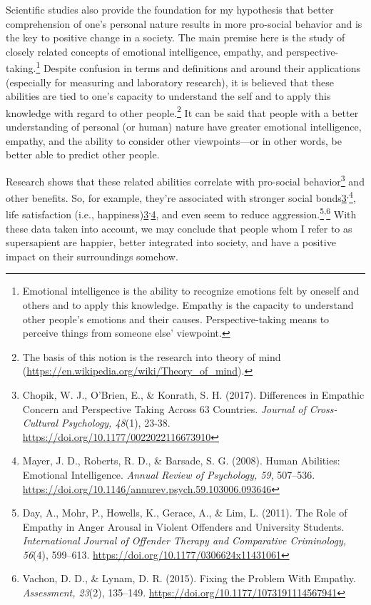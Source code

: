 \documentclass[12pt]{report}
\begin{document}
Scientific studies also provide the foundation for my hypothesis that better comprehension of one’s personal nature results in more pro-social behavior and is the key to positive change in a society. The main premise here is the study of closely related concepts of emotional intelligence, empathy, and perspective-taking.\footnote{Emotional intelligence is the ability to recognize emotions felt by oneself and others and to apply this knowledge. Empathy is the capacity to understand other people’s emotions and their causes. Perspective-taking means to perceive things from someone else’ viewpoint.} Despite confusion in terms and definitions and around their applications (especially for measuring and laboratory research), it is believed that these abilities are tied to one’s capacity to understand the self and to apply this knowledge with regard to other people.\footnote{The basis of this notion is the research into theory of mind (\url{https://en.wikipedia.org/wiki/Theory_of_mind}).} It can be said that people with a better understanding of personal (or human) nature have greater emotional intelligence, empathy, and the ability to consider other viewpoints\thinspace---\thinspace or in other words, be better able to predict other people.

\noindent Research shows that these related abilities correlate with pro-social behavior\footnote{\label{one}Chopik, W. J., O’Brien, E., \& Konrath, S. H. (2017). Differences in Empathic Concern and Perspective Taking Across 63 Countries. \emph{Journal of Cross-Cultural Psychology, 48}(1), 23-38. \url{https://doi.org/10.1177/0022022116673910}} and other benefits. So, for example, they’re associated with stronger social bonds\cref{one}\textsuperscript{,}\footnote{\label{two}Mayer, J. D., Roberts, R. D., \& Barsade, S. G. (2008). Human Abilities: Emotional Intelligence. \emph{Annual Review of Psychology, 59}, 507–536. \url{https://doi.org/10.1146/annurev.psych.59.103006.093646}}, life satisfaction (i.e., happiness)\cref{one}\textsuperscript{,}\cref{two}, and even seem to reduce aggression.\footnote{Day, A., Mohr, P., Howells, K., Gerace, A., \& Lim, L. (2011). The Role of Empathy in Anger Arousal in Violent Offenders and University Students. \emph{International Journal of Offender Therapy and Comparative Criminology, 56}(4), 599–613. \url{https://doi.org/10.1177/0306624x11431061}}\textsuperscript{,}\footnote{Vachon, D. D., \& Lynam, D. R. (2015). Fixing the Problem With Empathy. \emph{Assessment, 23}(2), 135–149. \url{https://doi.org/10.1177/1073191114567941}} With these data taken into account, we may conclude that people whom I refer to as supersapient are happier, better integrated into society, and have a positive impact on their surroundings somehow.
\end{document}
